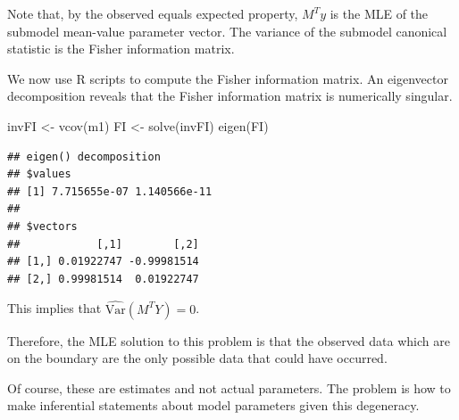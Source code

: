 \documentclass[
  ignorenonframetext,
]{beamer}
\newenvironment{Shaded}{\begin{snugshade}}{\end{snugshade}}
\newcommand{\FunctionTok}[1]{\textcolor[rgb]{0.00,0.00,0.00}{#1}}
\newcommand{\NormalTok}[1]{#1}
\newcommand{\OtherTok}[1]{\textcolor[rgb]{0.56,0.35,0.01}{#1}}
\begin{document}
\begin{frame}[fragile]{}
\protect\hypertarget{section-8}{}
Note that, by the observed equals expected property, \(M^Ty\) is the MLE
of the submodel mean-value parameter vector. The variance of the
submodel canonical statistic is the Fisher information matrix.

\vspace{12pt}

We now use R scripts to compute the Fisher information matrix. An
eigenvector decomposition reveals that the Fisher information matrix is
numerically singular.

\vspace{12pt}
\tiny

\begin{Shaded}
\begin{Highlighting}[]
\NormalTok{invFI }\OtherTok{\textless{}{-}} \FunctionTok{vcov}\NormalTok{(m1)}
\NormalTok{FI }\OtherTok{\textless{}{-}} \FunctionTok{solve}\NormalTok{(invFI)}
\FunctionTok{eigen}\NormalTok{(FI)}
\end{Highlighting}
\end{Shaded}

\begin{verbatim}
## eigen() decomposition
## $values
## [1] 7.715655e-07 1.140566e-11
## 
## $vectors
##            [,1]        [,2]
## [1,] 0.01922747 -0.99981514
## [2,] 0.99981514  0.01922747
\end{verbatim}
\end{frame}

\begin{frame}{}
\protect\hypertarget{section-9}{}
This implies that \(\widehat{\text{Var}}(M^TY) = 0\).

\vspace{12pt}

Therefore, the MLE solution to this problem is that the observed data
which are on the boundary are the only possible data that could have
occurred.

\vspace{12pt}

Of course, these are estimates and not actual parameters. The problem is
how to make inferential statements about model parameters given this
degeneracy.
\end{frame}
\end{document}
